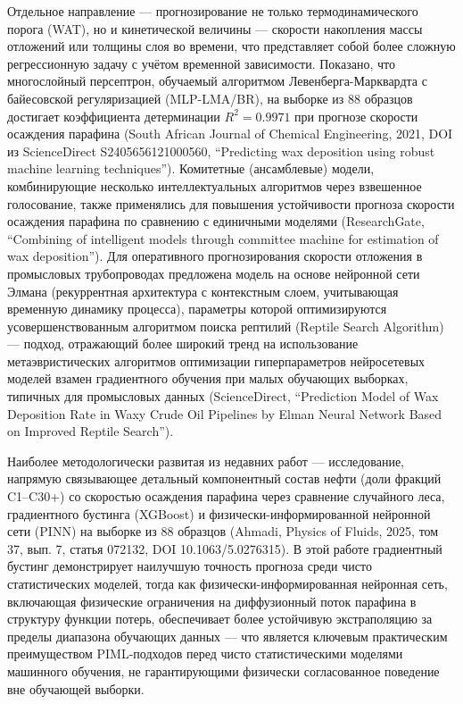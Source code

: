 \documentclass[11pt]{extarticle}
\begin{document}
Отдельное направление --- прогнозирование не только термодинамического порога (WAT), но и кинетической величины --- скорости накопления массы отложений или толщины слоя во времени, что представляет собой более сложную регрессионную задачу с учётом временной зависимости. Показано, что многослойный персептрон, обучаемый алгоритмом Левенберга-Марквардта с байесовской регуляризацией (MLP-LMA/BR), на выборке из 88 образцов достигает коэффициента детерминации \(R^2 = 0.9971\) при прогнозе скорости осаждения парафина (South African Journal of Chemical Engineering, 2021, DOI из ScienceDirect S2405656121000560, ``Predicting wax deposition using robust machine learning techniques''). Комитетные (ансамблевые) модели, комбинирующие несколько интеллектуальных алгоритмов через взвешенное голосование, также применялись для повышения устойчивости прогноза скорости осаждения парафина по сравнению с единичными моделями (ResearchGate, ``Combining of intelligent models through committee machine for estimation of wax deposition''). Для оперативного прогнозирования скорости отложения в промысловых трубопроводах предложена модель на основе нейронной сети Элмана (рекуррентная архитектура с контекстным слоем, учитывающая временную динамику процесса), параметры которой оптимизируются усовершенствованным алгоритмом поиска рептилий (Reptile Search Algorithm) --- подход, отражающий более широкий тренд на использование метаэвристических алгоритмов оптимизации гиперпараметров нейросетевых моделей взамен градиентного обучения при малых обучающих выборках, типичных для промысловых данных (ScienceDirect, ``Prediction Model of Wax Deposition Rate in Waxy Crude Oil Pipelines by Elman Neural Network Based on Improved Reptile Search'').

Наиболее методологически развитая из недавних работ --- исследование, напрямую связывающее детальный компонентный состав нефти (доли фракций C1--C30+) со скоростью осаждения парафина через сравнение случайного леса, градиентного бустинга (XGBoost) и физически-информированной нейронной сети (PINN) на выборке из 88 образцов (Ahmadi, Physics of Fluids, 2025, том 37, вып. 7, статья 072132, DOI 10.1063/5.0276315). В этой работе градиентный бустинг демонстрирует наилучшую точность прогноза среди чисто статистических моделей, тогда как физически-информированная нейронная сеть, включающая физические ограничения на диффузионный поток парафина в структуру функции потерь, обеспечивает более устойчивую экстраполяцию за пределы диапазона обучающих данных --- что является ключевым практическим преимуществом PIML-подходов перед чисто статистическими моделями машинного обучения, не гарантирующими физически согласованное поведение вне обучающей выборки.
\end{document}
